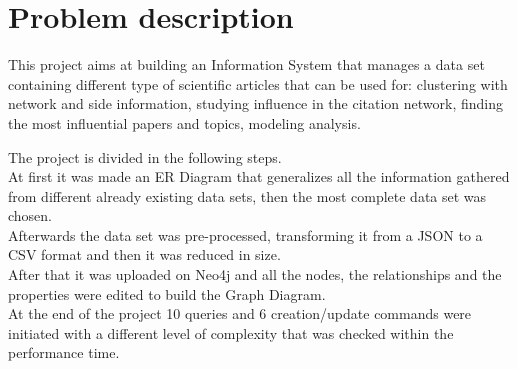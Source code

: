 \documentclass{Configuration_Files/PoliMi3i_thesis}
\begin{document}
\mainmatter %

%


\cleardoublepage
\newpage
\newpage
\chapter{Problem description}
\label{ch:description}
This project aims at building an Information System that manages a data set containing different type of scientific articles that can be used for: clustering with network and side information, studying influence in the citation network, finding the most influential papers and topics, modeling analysis.

The project is divided in the following steps.\\
At first it was made an ER Diagram that generalizes all the information gathered from different already existing data sets, then the most complete data set was chosen.\\
Afterwards the data set was pre-processed, transforming it from a JSON to a CSV format and then it was reduced in size.\\
After that it was uploaded on Neo4j and all the nodes, the relationships and the properties were edited to build the Graph Diagram.\\
At the end of the project 10 queries and 6 creation/update commands were initiated with a different level of complexity that was checked within the performance time.\\
\end{document}
